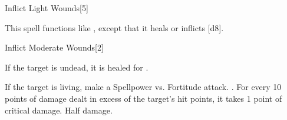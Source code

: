 \begin{spellsection}[Mass]{Inflict Light Wounds}[5]
    \begin{spellheader}
    \end{spellheader}
    \begin{spellcontent}
        \begin{spelltargetinginfo}
        \end{spelltargetinginfo}
        \begin{spelleffects}
            \spellspecial This spell functions like , except that it heals or inflicts \spelldamage{}[d8].
        \end{spelleffects}
    \end{spellcontent}
    \begin{spellfooter}
        \miscastexplode
    \end{spellfooter}
\end{spellsection}

\begin{spellsection}{Inflict Moderate Wounds}[2]
    \begin{spellheader}
    \end{spellheader}
    \begin{spellcontent}
        \begin{spelltargetinginfo}
        \end{spelltargetinginfo}
        \begin{spelleffects}
            \spelleffect If the target is undead, it is healed for \spelldamage{}.
            \begin{spellattacktriggered}{If the target is living, make a Spellpower vs. Fortitude attack.}
                \spellsuccess {}. For every 10 points of damage dealt in excess of the target's hit points, it takes 1 point of critical damage.
                \spellfailure Half damage.
            \end{spellattacktriggered}
        \end{spelleffects}
    \end{spellcontent}
    \begin{spellfooter}
        \miscastrandom
    \end{spellfooter}
\end{spellsection}

